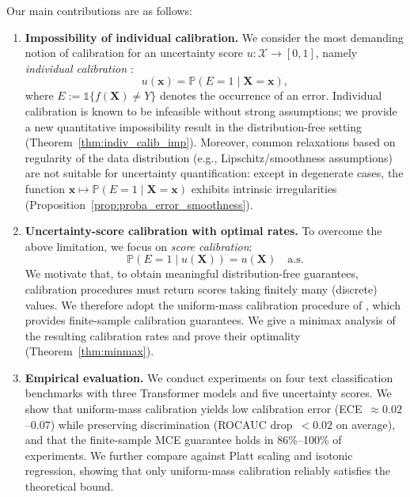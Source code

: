 \documentclass{article}
\theoremstyle{plain}
\theoremstyle{definition}
\theoremstyle{remark}
\begin{document}
Our main contributions are as follows:

\begin{enumerate}
  \item \textbf{Impossibility of individual calibration.}
  We consider the most demanding notion of calibration for an uncertainty score $u:\mathcal{X}\to[0,1]$, namely \emph{individual calibration} \citep{zhao_individual_2020, rina2020inference}:
  \[
    u(\mathbf{x}) = \mathbb{P}(E=1 \mid \mathbf{X}=\mathbf{x}),
  \]
  where $ E := \mathds{1}\{f(\mathbf{X})\neq Y\}$ denotes the occurrence of an error. Individual calibration is known to be infeasible without strong assumptions; we provide a new quantitative impossibility result in the distribution-free setting (Theorem~\ref{thm:indiv_calib_imp}).
  Moreover, common relaxations based on regularity of the data distribution (e.g., Lipschitz/smoothness assumptions) are not suitable for uncertainty quantification: except in degenerate cases, the function $\mathbf{x}\mapsto \mathbb{P}(E=1\mid \mathbf{X}=\mathbf{x})$ exhibits intrinsic irregularities (Proposition~\ref{prop:proba_error_smoothness}).

  \item \textbf{Uncertainty-score calibration with optimal rates.}
  To overcome the above limitation, we focus on \emph{score calibration}:
  \[
    \mathbb{P}(E=1 \mid u(\mathbf{X})) = u(\mathbf{X}) \quad \text{a.s.}
  \]
  We motivate that, to obtain meaningful distribution-free guarantees, calibration procedures must return scores taking finitely many (discrete) values.
  We therefore adopt the uniform-mass calibration procedure of \citet{gupta_distribution-free_2021}, which provides finite-sample calibration guarantees.
  We give a minimax analysis of the resulting calibration rates and prove their optimality (Theorem~\ref{thm:minmax}).

  \item \textbf{Empirical evaluation.}
  We conduct experiments on four text classification benchmarks with three Transformer models and five uncertainty scores.
  We show that uniform-mass calibration yields low calibration error (ECE~$\approx 0.02$--$0.07$) while preserving discrimination (ROCAUC drop~$< 0.02$ on average), and that the finite-sample MCE guarantee holds in 86\%--100\% of experiments.
  We further compare against Platt scaling and isotonic regression, showing that only uniform-mass calibration reliably satisfies the theoretical bound.
\end{enumerate}
\end{document}
